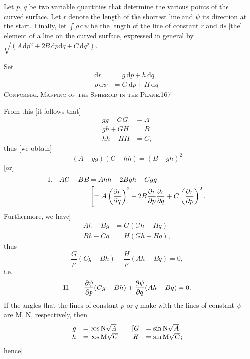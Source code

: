 Let $p$, $q$ be two variable quantities that determine the various points of the curved surface. Let $r$ denote the length of the shortest line and $\psi$ its direction at the start. Finally, let $\int\rho\,\mathrm d\psi$ be the length of the line of constant $r$ and $\mathrm ds$ [the] element of a line on the curved surface, expressed in general by $\sqrt{(A\,\mathrm dp^2+2B\,\mathrm dp\mathrm dq+C\,\mathrm dq^2)}$.

Set
\[
\begin{aligned}
\mathrm dr&=g\,\mathrm dp+h\,\mathrm dq\\
\rho\,\mathrm d\psi&=G\,\mathrm dp+H\,\mathrm dq.
\end{aligned}
\]
\clearpage
\noindent\mbox{}\hfill\textsc{Conformal Mapping of the Spheroid in the Plane.}\hfill167\par\medskip
From this [it follows that]
\[
\begin{aligned}
gg+GG&=A\\
gh+GH&=B\\
hh+HH&=C,
\end{aligned}
\]
thus [we obtain]
\[
(A-gg)(C-hh)=(B-gh)^2
\]
[or]
\[
\begin{array}{r@{\quad}l}
\mathrm I.&\begin{aligned}[t]
AC-BB&=Ahh-2Bgh+Cgg\\
&\left[=A\left(\frac{\partial r}{\partial q}\right)^2-2B\frac{\partial r}{\partial p}\frac{\partial r}{\partial q}+C\left(\frac{\partial r}{\partial p}\right)^2.\right.
\end{aligned}
\end{array}
\]
Furthermore, we have]
\[
\begin{aligned}
Ah-Bg&=G(Gh-Hg)\\
Bh-Cg&=H(Gh-Hg),
\end{aligned}
\]
thus
\[
\frac G\rho(Cg-Bh)+\frac H\rho(Ah-Bg)=0,
\]
i.e.
\[
\begin{array}{r@{\qquad}l}
\mathrm{II}.&\displaystyle\frac{\partial\psi}{\partial p}(Cg-Bh)+\frac{\partial\psi}{\partial q}(Ah-Bg)=0.
\end{array}
\]
If the angles that the lines of constant $p$ or $q$ make with the lines of constant $\psi$ are $\mathrm M$, $\mathrm N$, respectively, then
\[
\begin{array}{rl@{\qquad}rl}
g&=\cos\mathrm N\sqrt A&[G&=\sin\mathrm N\sqrt A\\
h&=\cos\mathrm M\sqrt C&H&=\sin\mathrm M\sqrt C;
\end{array}
\]
hence]
